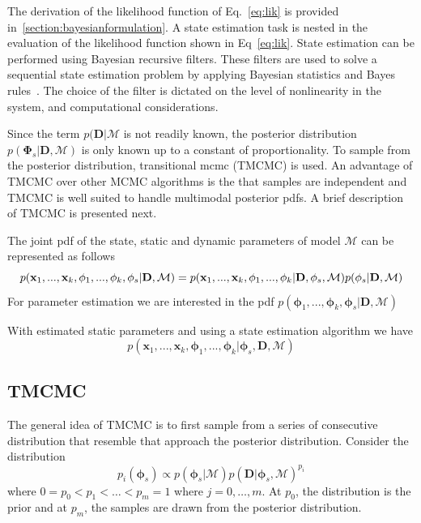 \documentclass[]{elsarticle}
\renewcommand{\vec}[1]{\mathbf{#1}}
\begin{document}
The derivation of the likelihood function of Eq.~\eqref{eq:lik} is provided in~\ref{section:bayesianformulation}. A state estimation task is nested in the evaluation of the likelihood function shown in Eq~\eqref{eq:lik}. State estimation can be performed using Bayesian recursive filters. These filters are used to solve a sequential state estimation problem by applying Bayesian statistics and Bayes rules~\cite{Chen2003}. The choice of the filter is dictated on the level of nonlinearity in the system, and computational considerations.  

Since the term $p(\vec{D} | \mathcal{M}$ is not readily known, the posterior distribution $p(\vec{\Phi}_s | \vec{D}, \mathcal{M})$ is only known up to a constant of proportionality. To sample from the posterior distribution, transitional mcmc (TMCMC) is used. An advantage of TMCMC over other MCMC algorithms is the that samples are independent and TMCMC is well suited to handle multimodal posterior pdfs. A brief description of TMCMC is presented next.


The joint pdf of the state, static and dynamic parameters of model $\mathcal{M}$ can be represented as follows
\begin{equation}
p(\vec{x}_1,...,\vec{x}_k,\vec{\phi}_1,...,\vec{\phi}_k, \vec{\phi}_s | \vec{D}, \mathcal{M}) = p(\vec{x}_1,...,\vec{x}_k,\vec{\phi}_1,...,\vec{\phi}_k | \vec{D}, \vec{\phi}_s, \mathcal{M}) p(\vec{\phi}_s | \vec{D},\mathcal{M}) \\
\end{equation}
For parameter estimation we are interested in the pdf $p(\vec{\phi}_1,...,\vec{\phi}_k, \vec{\phi}_s | \vec{D}, \mathcal{M})$

With estimated static parameters and using a state estimation algorithm we have
\begin{equation}
p(\vec{x}_1,...,\vec{x}_k,\vec{\phi}_1,...,\vec{\phi}_k | \vec{\phi}_s , \vec{D}, \mathcal{M})
\end{equation}

\subsection*{TMCMC}

The general idea of TMCMC is to first sample from a series of consecutive distribution that resemble that approach the posterior distribution. Consider the distribution
\begin{equation}
p_i( \vec{\phi}_s ) \propto p( \vec{\phi}_s | \mathcal{M} ) p( \vec{D} | \vec{\phi}_s , \mathcal{M} )^{p_i}
\end{equation}
where $0 = p_0 < p_1 < \dots < p_m = 1$ where $j = 0, \dots, m$. At $p_0$, the distribution is the prior and at $p_m$, the samples are drawn from the posterior distribution. 
\end{document}
